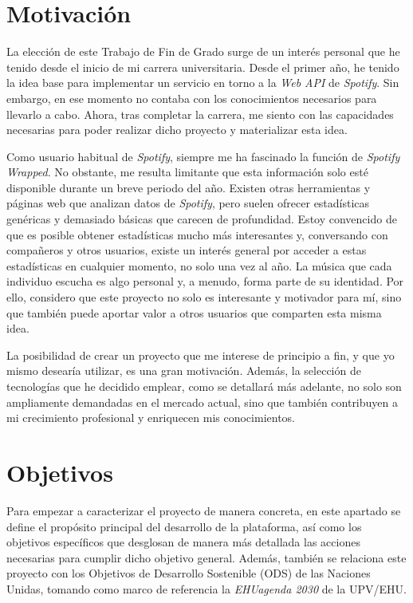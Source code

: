 \section{Motivación}

La elección de este Trabajo de Fin de Grado surge de un interés personal que he tenido desde el inicio de mi carrera universitaria. Desde el primer año, he tenido la idea base para implementar un servicio en torno a la \textit{Web API} de \textit{Spotify}. Sin embargo, en ese momento no contaba con los conocimientos necesarios para llevarlo a cabo. Ahora, tras completar la carrera, me siento con las capacidades necesarias para poder realizar dicho proyecto y materializar esta idea.

Como usuario habitual de \textit{Spotify}, siempre me ha fascinado la función de \textit{Spotify Wrapped}. No obstante, me resulta limitante que esta información solo esté disponible durante un breve periodo del año. Existen otras herramientas y páginas web que analizan datos de \textit{Spotify}, pero suelen ofrecer estadísticas genéricas y demasiado básicas que carecen de profundidad. Estoy convencido de que es posible obtener estadísticas mucho más interesantes y, conversando con compañeros y otros usuarios, existe un interés general por acceder a estas estadísticas en cualquier momento, no solo una vez al año. La música que cada individuo escucha es algo personal y, a menudo, forma parte de su identidad. Por ello, considero que este proyecto no solo es interesante y motivador para mí, sino que también puede aportar valor a otros usuarios que comparten esta misma idea.

La posibilidad de crear un proyecto que me interese de principio a fin, y que yo mismo desearía utilizar, es una gran motivación. Además, la selección de tecnologías que he decidido emplear, como se detallará más adelante, no solo son ampliamente demandadas en el mercado actual, sino que también contribuyen a mi crecimiento profesional y enriquecen mis conocimientos.

\section{Objetivos}

Para empezar a caracterizar el proyecto de manera concreta, en este apartado se define el propósito principal del desarrollo de la plataforma, así como los objetivos específicos que desglosan de manera más detallada las acciones necesarias para cumplir dicho objetivo general. Además, también se relaciona este proyecto con los Objetivos de Desarrollo Sostenible (ODS) de las Naciones Unidas, tomando como marco de referencia la \textit{EHUagenda 2030} de la UPV/EHU.

